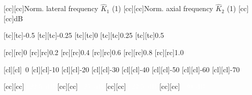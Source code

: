 [cc][cc]{\footnotesize Norm. lateral frequency $\hat{K}_{1}$ (1)}
[cc][cc]{\footnotesize Norm. axial frequency $\hat{K}_{2}$ (1)}
[cc][cc]{\footnotesize \si{\deci\bel}}

[tc][tc]{\scriptsize -0.5}
[tc][tc]{\scriptsize -0.25}
[tc][tc]{\scriptsize 0}
[tc][tc]{\scriptsize 0.25}
[tc][tc]{\scriptsize 0.5}

[rc][rc]{\scriptsize 0}
[rc][rc]{\scriptsize 0.2}
[rc][rc]{\scriptsize 0.4}
[rc][rc]{\scriptsize 0.6}
[rc][rc]{\scriptsize 0.8}
[rc][rc]{\scriptsize 1.0}

[cl][cl]{\scriptsize ~0}
[cl][cl]{\scriptsize -10}
[cl][cl]{\scriptsize -20}
[cl][cl]{\scriptsize -30}
[cl][cl]{\scriptsize -40}
[cl][cl]{\scriptsize -50}
[cl][cl]{\scriptsize -60}
[cl][cl]{\scriptsize -70}

[cc][cc]{\tiny \textcolor{white}{\SI{-22.5}{\deci\bel}}}
[cc][cc]{\tiny \textcolor{white}{\SI{-25}{\deci\bel}}}
[cc][cc]{\tiny \textcolor{white}{\SI{-27.5}{\deci\bel}}}
[cc][cc]{\tiny \textcolor{white}{\SI{-30}{\deci\bel}}}

